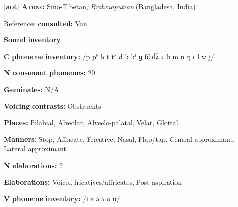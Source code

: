 \begin{styleBody}
\textbf{[aot]}   \textbf{\textsc{Atong}  }  Sino-Tibetan, \textit{Brahmaputran} (Bangladesh, India)
\end{styleBody}

\begin{styleBody}
References \textbf{consulted:} Van \citet{Breugel2008}
\end{styleBody}

\begin{styleBody}
\textbf{Sound} \textbf{inventory}
\end{styleBody}

\begin{styleBody}
\textbf{C} \textbf{phoneme} \textbf{inventory:} /p pʰ b t tʰ d k kʰ ɡ t͡ɕ d͡ʑ ɕ h m n ŋ ɾ l w j/
\end{styleBody}

\begin{styleBody}
\textbf{N} \textbf{consonant} \textbf{phonemes:} 20
\end{styleBody}

\begin{styleBody}
\textbf{Geminates:} N/A
\end{styleBody}

\begin{styleBody}
\textbf{Voicing} \textbf{contrasts:} Obstruents
\end{styleBody}

\begin{styleBody}
\textbf{Places:} Bilabial, Alveolar, Alveolo-palatal, Velar, Glottal
\end{styleBody}

\begin{styleBody}
\textbf{Manners:} Stop, Affricate, Fricative, Nasal, Flap/tap, Central approximant, Lateral approximant
\end{styleBody}

\begin{styleBody}
\textbf{N} \textbf{elaborations:} 2
\end{styleBody}

\begin{styleBody}
\textbf{Elaborations:} Voiced fricatives/affricates, Post-aspiration
\end{styleBody}

\begin{styleBody}
\textbf{V} \textbf{phoneme} \textbf{inventory:} /i e ə a o u/
\end{styleBody}

